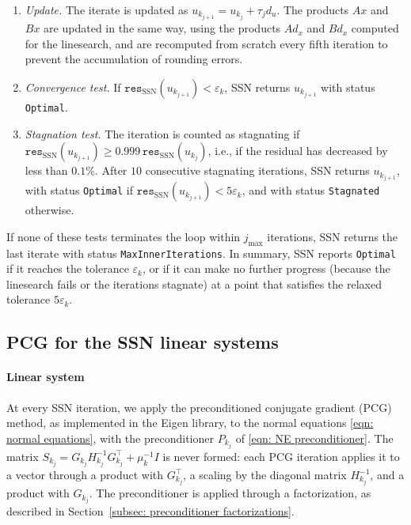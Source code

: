 \begin{enumerate}
    \begin{enumerate}[(a)]
        \item if $\texttt{res}_{\mathrm{SSN}}(u_{k_j}) \le 5\varepsilon_k$, SSN returns $u_{k_j}$ with status \texttt{Optimal};
        \item otherwise, $d_u$ is replaced by the steepest-descent direction $-\nabla_u \mathcal{M}_k(u_{k_j})$ and the linesearch is repeated; if it again returns $\tau_j \le 0$, SSN returns $u_{k_j}$ with status \texttt{LineSearchFailed}.
    \end{enumerate}
    \item \emph{Update.} The iterate is updated as $u_{k_{j+1}} = u_{k_j} + \tau_j d_u$. The products $Ax$ and $Bx$ are updated in the same way, using the products $Ad_x$ and $Bd_x$ computed for the linesearch, and are recomputed from scratch every fifth iteration to prevent the accumulation of rounding errors.
    \item \emph{Convergence test.} If $\texttt{res}_{\mathrm{SSN}}(u_{k_{j+1}}) < \varepsilon_k$, SSN returns $u_{k_{j+1}}$ with status \texttt{Optimal}.
    \item \emph{Stagnation test.} The iteration is counted as stagnating if $\texttt{res}_{\mathrm{SSN}}(u_{k_{j+1}}) \ge 0.999\, \texttt{res}_{\mathrm{SSN}}(u_{k_j})$, i.e., if the residual has decreased by less than $0.1\%$. After $10$ consecutive stagnating iterations, SSN returns $u_{k_{j+1}}$, with status \texttt{Optimal} if $\texttt{res}_{\mathrm{SSN}}(u_{k_{j+1}}) < 5\varepsilon_k$, and with status \texttt{Stagnated} otherwise.
\end{enumerate}
If none of these tests terminates the loop within $j_{\max}$ iterations, SSN returns the last iterate with status \texttt{MaxInnerIterations}. In summary, SSN reports \texttt{Optimal} if it reaches the tolerance $\varepsilon_k$, or if it can make no further progress (because the linesearch fails or the iterations stagnate) at a point that satisfies the relaxed tolerance $5\varepsilon_k$.


\subsection{PCG for the SSN linear systems} \label{subsec: PCG implementation}

\paragraph{Linear system} At every SSN iteration, we apply the preconditioned conjugate gradient (PCG) method, as implemented in the Eigen library, to the normal equations \eqref{eqn: normal equations}, with the preconditioner $P_{k_j}$ of \eqref{eqn: NE preconditioner}. The matrix $S_{k_j} = G_{k_j} H_{k_j}^{-1} G_{k_j}^\top + \mu_k^{-1} I$ is never formed: each PCG iteration applies it to a vector through a product with $G_{k_j}^\top$, a scaling by the diagonal matrix $H_{k_j}^{-1}$, and a product with $G_{k_j}$. The preconditioner is applied through a factorization, as described in Section~\ref{subsec: preconditioner factorizations}.

